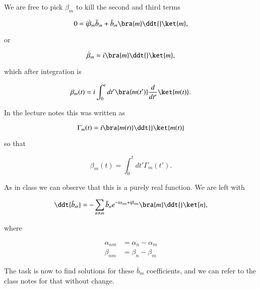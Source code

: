 We are free to pick $\beta_m$ to kill the second and third terms

\begin{equation}\label{eqn:adiabaticPertTakeII:130}
0 =
i \dot{\beta}_m \bar{b}_m
+ 
\bar{b}_m \bra{m} \ddt{} \ket{m},
\end{equation}

or

\begin{equation}\label{eqn:adiabaticPertTakeII:150}
\dot{\beta}_m 
= 
i \bra{m} \ddt{} \ket{m},
\end{equation}

which after integration is

\begin{equation}\label{eqn:adiabaticPertTakeII:170}
\beta_m(t)
= 
i \int_0^t dt' \bra{m(t')} \frac{d}{dt'} \ket{m(t)}.
\end{equation}

In the lecture notes this was written as

\begin{equation}\label{eqn:adiabaticPertTakeII:150}
\Gamma_m(t) = i \bra{m(t)} \ddt{} \ket{m(t)}
\end{equation}

so that

\begin{equation}\label{eqn:adiabaticPertTakeII:150}
\beta_m(t) = \int_0^t dt' \Gamma_m(t').
\end{equation}

As in class we can observe that this is a purely real function.  We are left with

\begin{equation}\label{eqn:adiabaticPertTakeII:190}
\ddt{\bar{b}_m}
=
-
\sum_{n \ne m} \bar{b}_n 
e^{-i \alpha_{nm} + i \beta_{nm}}
\bra{m} \ddt{} \ket{n} 
,
\end{equation}

where

\begin{align}\label{eqn:adiabaticPertTakeII:210}
\alpha_{nm} &= \alpha_{n} -\alpha_m \\
\beta_{nm} &= \beta_{n} -\beta_m 
\end{align}

The task is now to find solutions for these $\bar{b}_m$ coefficients, and we can refer to the class notes for that without change.

\EndArticle
